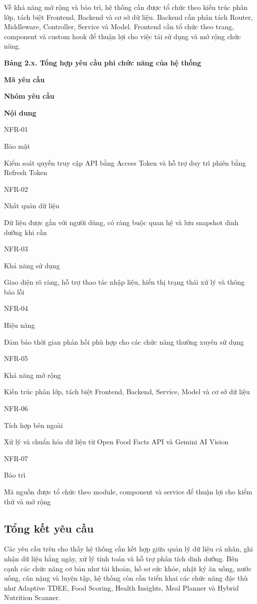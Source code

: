 \documentclass[12pt, a4paper]{report}
\begin{document}
Về khả năng mở rộng và bảo trì, hệ thống cần được tổ chức theo kiến trúc phân lớp, tách biệt Frontend, Backend và cơ sở dữ liệu. Backend cần phân tách Router, Middleware, Controller, Service và Model. Frontend cần tổ chức theo trang, component và custom hook để thuận lợi cho việc tái sử dụng và mở rộng chức năng.

\textbf{Bảng 2.x. Tổng hợp yêu cầu phi chức năng của hệ thống}

\textbf{Mã yêu cầu}

\textbf{Nhóm yêu cầu}

\textbf{Nội dung}

NFR-01

Bảo mật

Kiểm soát quyền truy cập API bằng Access Token và hỗ trợ duy trì phiên bằng Refresh Token

NFR-02

Nhất quán dữ liệu

Dữ liệu được gắn với người dùng, có ràng buộc quan hệ và lưu snapshot dinh dưỡng khi cần

NFR-03

Khả năng sử dụng

Giao diện rõ ràng, hỗ trợ thao tác nhập liệu, hiển thị trạng thái xử lý và thông báo lỗi

NFR-04

Hiệu năng

Đảm bảo thời gian phản hồi phù hợp cho các chức năng thường xuyên sử dụng

NFR-05

Khả năng mở rộng

Kiến trúc phân lớp, tách biệt Frontend, Backend, Service, Model và cơ sở dữ liệu

NFR-06

Tích hợp bên ngoài

Xử lý và chuẩn hóa dữ liệu từ Open Food Facts API và Gemini AI Vision

NFR-07

Bảo trì

Mã nguồn được tổ chức theo module, component và service để thuận lợi cho kiểm thử và mở rộng

\subsection{Tổng kết yêu cầu}Các yêu cầu trên cho thấy hệ thống cần kết hợp giữa quản lý dữ liệu cá nhân, ghi nhận dữ liệu hằng ngày, xử lý tính toán và hỗ trợ phân tích dinh dưỡng. Bên cạnh các chức năng cơ bản như tài khoản, hồ sơ sức khỏe, nhật ký ăn uống, nước uống, cân nặng và luyện tập, hệ thống còn cần triển khai các chức năng đặc thù như Adaptive TDEE, Food Scoring, Health Insights, Meal Planner và Hybrid Nutrition Scanner.
\end{document}
